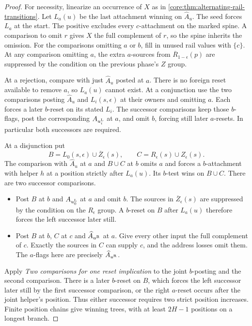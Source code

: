 \begin{proof}
For necessity, linearize an occurrence of $X$ as in
\cref{core:thm:alternating-rail-transitions}. Let $L_a(u)$ be the
last attachment winning on $\widehat A_u$. The seed forces
$L_a$ at the start. The positive excludes every $c$-attachment
on the marked spine. A comparison to omit $r$ gives $X$ the
full complement of $r$, so the spine inherits the omission.
For the comparisons omitting $a$ or $b$, fill in unused rail values
with $\{c\}$. At any comparison omitting $a$, the extra $a$-sources
from $\overline R_{1-\epsilon}(p)$ are suppressed by the condition
on the previous phase's $Z$ group.

At a rejection, compare with just $\widehat A_u$ posted at $a$.
There is no foreign reset available to remove $a$, so $L_a(u)$
cannot exist. At a conjunction use the two comparisons posting
$\widehat A_u$ and $L_i(s,\epsilon)$ at their owners and omitting
$a$. Each forces a later $b$-reset on its stated $L_i$. The
successor comparisons keep those $b$-flags, post the corresponding
$A_{u_i^{\rm L}}$ at $a$, and omit $b$, forcing still later
$a$-resets. In particular both successors are required.

At a disjunction put
\[
  B=L_0(s,\epsilon)\cup\overline Z_\epsilon(s),\qquad
  C=R_\epsilon(s)\cup Z_\epsilon(s).
\]
The comparison with $\widehat A_u$ at $a$ and $B\cup C$ at $b$
omits $a$ and forces a $b$-attachment with helper $h$ at a position
strictly after $L_a(u)$. Its $b$-test wins on $B\cup C$.
There are two successor comparisons.
\begin{itemize}
\item Post $B$ at $b$ and $A_{u_0^{\rm L}}$ at $a$ and omit
$b$. The sources in $\overline Z_\epsilon(s)$ are suppressed
by the condition on the $R_\epsilon$ group. A $b$-reset on $B$
after $L_a(u)$ therefore forces the left successor later still.
\item Post $B$ at $b$, $C$ at $c$ and $\widehat A_{u^{\rm R}}$
at $a$. Give every other input the full complement of $c$.
Exactly the sources in $C$ can supply $c$, and the address
losses omit them. The $a$-flags here are precisely
$\widehat A_{u^{\rm R}}$.
\end{itemize}
Apply \emph{Two comparisons for one reset implication}
to the joint $b$-posting and the second comparison.
There is a later $b$-reset on $B$, which forces
the left successor later still by the first
successor comparison, or the right $a$-reset
occurs after the joint helper's position.
Thus either successor requires two strict
position increases. Finite position chains give winning
trees, with at least $2H-1$ positions on a longest branch.


\end{proof}
